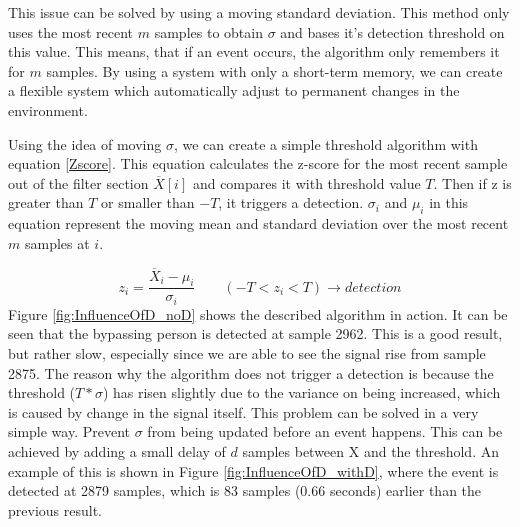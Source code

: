 This issue can be solved by using a moving standard deviation. This method only uses the most recent $m$ samples to obtain $\sigma$ and bases it's detection threshold on this value. This means, that if an event occurs, the algorithm only remembers it for $m$ samples. By using a system with only a short-term memory, we can create a flexible system which automatically adjust to permanent changes in the environment.

Using the idea of moving $\sigma$, we can create a simple threshold algorithm with equation \ref{Zscore}. This equation calculates the z-score for the most recent sample out of the filter section $\overline{X}[i]$ and compares it with threshold value $T$. Then if z is greater than $T$ or smaller than $-T$, it triggers a detection. $\sigma_i$ and $\mu_i$ in this equation represent the moving mean and standard deviation over the most recent $m$ samples at $i$.

\begin{equation}
	\label{Zscore}
	z_i = \frac{\overline{X}_i - \mu_i}{\sigma_i}
	\qquad
	(-T < z_i < T) \rightarrow detection 
\end{equation}
Figure \ref{fig:InfluenceOfD_noD} shows the described algorithm in action. It can be seen that the bypassing person is detected at sample 2962. This is a good result, but rather slow, especially since we are able to see the signal rise from sample 2875. The reason why the algorithm does not trigger a detection is because the threshold ($T * \sigma$) has risen slightly due to the variance on being increased, which is caused by change in the signal itself. This problem can be solved in a very simple way. Prevent $\sigma$ from being updated before an event happens. This can be achieved by adding a small delay of $d$ samples between X and the threshold. An example of this is shown in Figure \ref{fig:InfluenceOfD_withD}, where the event is detected at 2879 samples, which is 83 samples (0.66 seconds) earlier than the previous result.

